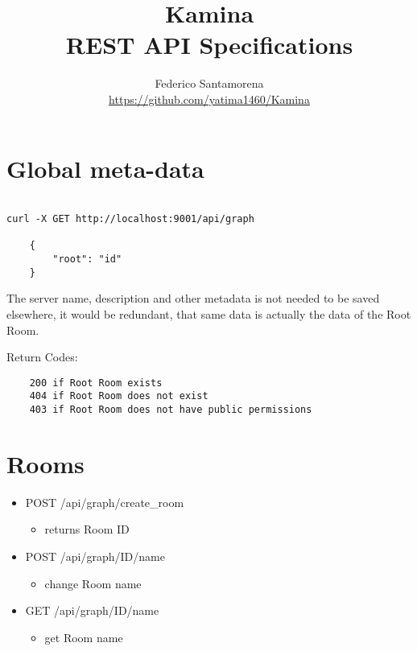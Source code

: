 \documentclass[12pt]{article}
\begin{document}
\title
{
    Kamina \\
    REST API Specifications \\
}
\author
{
    Federico Santamorena \\
    \href{https://github.com/yatima1460/Kamina}{https://github.com/yatima1460/Kamina} \\ 
}
\maketitle



\section{Global meta-data}

\begin{verbatim}

curl -X GET http://localhost:9001/api/graph

    {
        "root": "id"
    }

\end{verbatim}

The server name, description and other metadata is not needed to be saved elsewhere, it would be redundant, that same data is actually the data of the Root  Room.

Return Codes:
\begin{verbatim}
    200 if Root Room exists
    404 if Root Room does not exist
    403 if Root Room does not have public permissions

\end{verbatim}




\section{Rooms}


\begin{itemize}
    \item POST /api/graph/create\_room
    \begin{itemize}
        \item returns Room ID
    \end{itemize}
    \item POST /api/graph/ID/name
    \begin{itemize}
        \item change Room name
    \end{itemize}
    \item GET /api/graph/ID/name
    \begin{itemize}
        \item get Room name
    \end{itemize}
\end{itemize}
\end{document}
